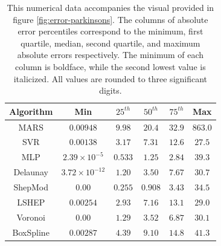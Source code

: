 \documentclass[smallextended,final]{svjour3}       %
\begin{document}
\begin{appendix}
\begin{table}
  \centering
  \begin{tabular}{c|c|c|c|c|c}
    \hline
    Algorithm & Min & $25^{th}$ & $50^{th}$ & $75^{th}$ & Max\\
    \hline
    MARS & $0.00948$ & $9.98$ & $20.4$ & $32.9$ & $863.0$\\
    SVR & $0.00138$ & $3.17$ & $7.31$ & $12.6$ & $\mathbf{27.5}$\\
    MLP & $2.39 \times 10^{-5}$ & $\mathit{0.533}$ & $\mathit{1.25}$ & $\mathbf{2.84}$ & $39.3$\\
    Delaunay & $\mathit{3.72 \times 10^{-12}}$ & $1.20$ & $3.50$ & $7.67$ & $30.7$\\
    ShepMod & $\mathbf{0.00}$ & $\mathbf{0.255}$ & $\mathbf{0.908}$ & $\mathit{3.43}$ & $34.5$\\
    LSHEP & $0.00254$ & $2.93$ & $7.16$ & $13.1$ & $\mathit{29.0}$\\
    Voronoi & $\mathbf{0.00}$ & $1.29$ & $3.52$ & $6.87$ & $30.1$\\
    BoxSpline & $0.00287$ & $4.39$ & $9.10$ & $14.8$ & $41.3$\\
    \hline
  \end{tabular}
  \caption{This numerical data accompanies the visual provided in
    figure \ref{fig:error-parkinsons}. The columns of absolute error
    percentiles correspond to the minimum, first quartile, median,
    second quartile, and maximum absolute errors respectively. The
    minimum of each column is boldface, while the second lowest value
    is italicized. All values are rounded to three significant
    digits.}
  \label{table:error-parkinsons}
\end{table}


\end{appendix}
\end{document}
